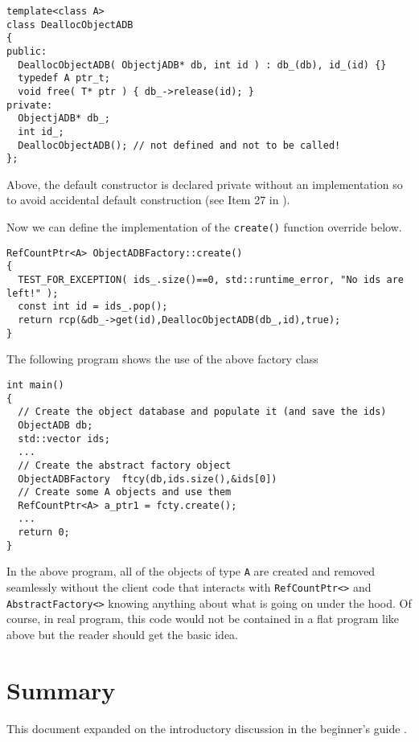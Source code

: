 {\scriptsize\begin{verbatim}
template<class A>
class DeallocObjectADB
{
public:
  DeallocObjectADB( ObjectjADB* db, int id ) : db_(db), id_(id) {}
  typedef A ptr_t;
  void free( T* ptr ) { db_->release(id); }
private:
  ObjectjADB* db_;
  int id_;
  DeallocObjectADB(); // not defined and not to be called!
};
\end{verbatim}}

{}\noindent{}Above, the default constructor is declared private
without an implementation so to avoid accidental default construction
(see Item 27 in {}\cite{ref:meyers_1994}).

Now we can define the implementation of the {}\texttt{create()} function
override below.

{\scriptsize\begin{verbatim}
RefCountPtr<A> ObjectADBFactory::create()
{
  TEST_FOR_EXCEPTION( ids_.size()==0, std::runtime_error, "No ids are left!" );
  const int id = ids_.pop();
  return rcp(&db_->get(id),DeallocObjectADB(db_,id),true);
}
\end{verbatim}}

The following program shows the use of the above factory class

{\scriptsize\begin{verbatim}
int main()
{
  // Create the object database and populate it (and save the ids)
  ObjectADB db;
  std::vector ids;
  ...
  // Create the abstract factory object
  ObjectADBFactory  ftcy(db,ids.size(),&ids[0])
  // Create some A objects and use them
  RefCountPtr<A> a_ptr1 = fcty.create();
  ...
  return 0;
}
\end{verbatim}}

In the above program, all of the objects of type {}\texttt{A} are
created and removed seamlessly without the client code that interacts
with {}\texttt{RefCountPtr<>} and {}\texttt{AbstractFactory<>} knowing
anything about what is going on under the hood.  Of course, in real
program, this code would not be contained in a flat program like above
but the reader should get the basic idea.

%
\section{Summary}
%

This document expanded on the introductory discussion in the
beginner's guide {}\cite{ref:RefCountPtrBeginnersGuide}.
